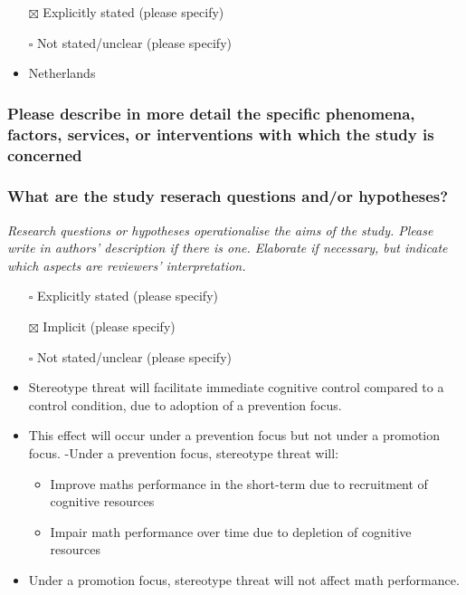 \documentclass[
  doc, a4paper]{apa7}
\providecommand{\tightlist}{%
  \setlength{\itemsep}{0pt}\setlength{\parskip}{0pt}}
\begin{document}
\begin{itemize}
\item[$\boxtimes$]
  Explicitly stated (please specify)\\
\item[$\square$]
  Not stated/unclear (please specify)
\item
  Netherlands
\end{itemize}

\subsubsection{Please describe in more detail the specific phenomena, factors, services, or interventions with which the study is concerned}\label{please-describe-in-more-detail-the-specific-phenomena-factors-services-or-interventions-with-which-the-study-is-concerned}

\subsubsection{What are the study reserach questions and/or hypotheses?}\label{what-are-the-study-reserach-questions-andor-hypotheses}

\emph{Research questions or hypotheses operationalise the aims of the study. Please write in authors' description if there is one. Elaborate if necessary, but indicate which aspects are reviewers' interpretation.}

\begin{itemize}
\item[$\square$]
  Explicitly stated (please specify)\\
\item[$\boxtimes$]
  Implicit (please specify)\\
\item[$\square$]
  Not stated/unclear (please specify)
\item
  Stereotype threat will facilitate immediate cognitive control compared to a control condition, due to adoption of a prevention focus.
\item
  This effect will occur under a prevention focus but not under a promotion focus.
  -Under a prevention focus, stereotype threat will:

  \begin{itemize}
  \tightlist
  \item
    Improve maths performance in the short-term due to recruitment of cognitive resources
  \item
    Impair math performance over time due to depletion of cognitive resources
  \end{itemize}
\item
  Under a promotion focus, stereotype threat will not affect math performance.
\end{itemize}
\end{document}
